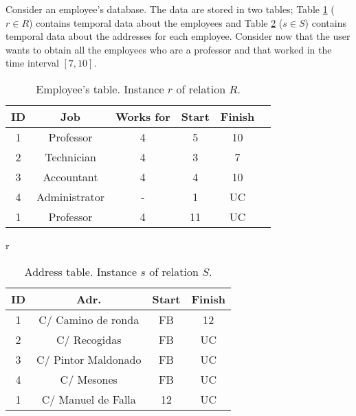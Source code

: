 \begin{example}
Consider an employee's database. The data are stored in two tables; Table \ref{table:employees} ($r \in R$) contains temporal data about the employees and Table \ref{table:address} ($s \in S$) contains temporal  data about the addresses for each employee. Consider now that the user wants to obtain all the employees who are a professor and that worked in the time interval $\left[7, 10 \right]$.

\begin{table}
\centering
\caption{Employee's table. Instance $r$ of relation $R$.}
\vspace{2mm}

\begin{tabular}{c c c c c c }
\hline
ID & Job & Works for & Start & Finish \\ \hline
1 & Professor & 4 & 5 & 10 \\
2 & Technician & 4 & 3 & 7 \\
3 & Accountant & 4  & 4 & 10 \\
4 & Administrator & - & 1 & UC \\
1 & Professor & 4 & 11 & UC \\
\hline 
\end{tabular}
\label{table:employees}



\end{table}



\begin{table}
\centering
r\caption{Address table. Instance $s$ of relation $S$.}
\vspace{2mm}
\begin{tabular}{c c c c }
\hline
ID & Adr. & Start & Finish \\ \hline
1 & C/ Camino de ronda & FB & 12 \\
2 & C/ Recogidas & FB & UC \\ 
3 & C/ Pintor Maldonado & FB & UC \\
4 & C/ Mesones & FB & UC \\
1 & C/ Manuel de Falla & 12 & UC \\
\hline 
\end{tabular}
\label{table:address}


\end{table}
\end{example}
